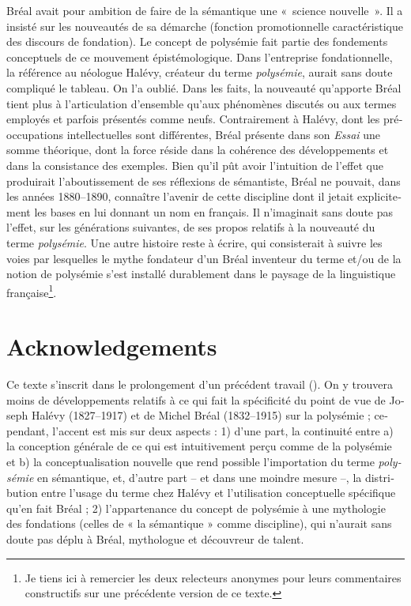 \documentclass[output=paper]{langsci/langscibook}
\begin{document}
\begin{otherlanguage}{french}
Bréal avait pour ambition de faire de la sémantique une «~science nouvelle~». Il a insisté sur les nouveautés de sa démarche (fonction promotionnelle caractéristique des discours de fondation). Le concept de polysémie fait partie des fondements conceptuels de ce mouvement épistémologique. Dans l’entreprise fondationnelle, la référence au néologue Halévy, créateur du terme \textit{polysémie}, aurait sans doute compliqué le tableau. On l’a oublié. Dans les faits, la nouveauté qu’apporte Bréal tient plus à l’articulation d’ensemble qu’aux phénomènes discutés ou aux termes employés et parfois présentés comme neufs. Contrairement à Halévy, dont les préoccupations intellectuelles sont différentes, Bréal présente dans son \textit{Essai} une somme théorique, dont la force réside dans la cohérence des développements et dans la consistance des exemples. Bien qu’il pût avoir l’intuition de l’effet que produirait l’aboutissement de ses réflexions de sémantiste, Bréal ne pouvait, dans les années 1880--1890, connaître l’avenir de cette discipline dont il jetait explicitement les bases en lui donnant un nom en français. Il n’imaginait sans doute pas l’effet, sur les générations suivantes, de ses propos relatifs à la nouveauté du terme \textit{polysémie}. Une autre histoire reste à écrire, qui consisterait à suivre les voies par lesquelles le mythe fondateur d’un Bréal inventeur du terme et/ou de la notion de polysémie s’est installé durablement dans le paysage de la linguistique française\footnote{ \textrm{Je tiens ici à remercier les deux relecteurs anonymes pour leurs commentaires constructifs sur une précédente version de ce texte.}}.

\section*{Acknowledgements}
Ce texte s’inscrit dans le prolongement d’un précédent travail (\citealt{courbon_sur_2015}). On y trouvera moins de développements relatifs à ce qui fait la spécificité du point de vue de Joseph Halévy (1827--1917) et de Michel Bréal (1832--1915) sur la polysémie ; cependant, l’accent est mis sur deux aspects : 1) d’une part, la continuité entre a) la conception générale de ce qui est intuitivement perçu comme de la polysémie et b) la conceptualisation nouvelle que rend possible l’importation du terme \textit{polysémie} en sémantique, et, d’autre part – et dans une moindre mesure –, la distribution entre l’usage du terme chez Halévy et l’utilisation conceptuelle spécifique qu’en fait Bréal ; 2) l’appartenance du concept de polysémie à une mythologie des fondations (celles de « la sémantique » comme discipline), qui n’aurait sans doute pas déplu à Bréal, mythologue et découvreur de talent.

{\sloppy\printbibliography[heading=subbibliography,notkeyword=this]}
\end{otherlanguage}
\end{document}
